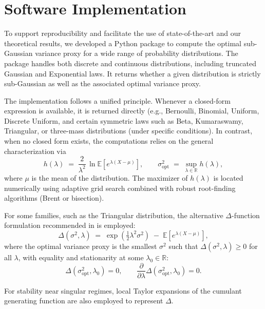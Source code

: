 \documentclass[a4paper, 10pt]{article}
\theoremstyle{definition}
\begin{document}
\section{Software Implementation}
To support reproducibility and facilitate the use of state-of-the-art and our theoretical results, 
we developed a Python package to compute the optimal sub-Gaussian variance proxy for a wide range of probability distributions. 
The package handles both discrete and continuous distributions, including truncated Gaussian and Exponential laws. 
It returns whether a given distribution is strictly sub-Gaussian as well as the associated optimal variance proxy. 

The implementation follows a unified principle. 
Whenever a closed-form expression is available, it is returned directly (e.g., Bernoulli, Binomial, Uniform, Discrete Uniform, and certain symmetric laws such as Beta, Kumaraswamy, Triangular, or  three-mass distributions (under specific conditions). 
In contrast, when no closed form exists, the computations relies on the general characterization via
\[
h(\lambda) \;=\; \frac{2}{\lambda^{2}} \, \ln \mathbb{E}\!\left[e^{\lambda(X-\mu)}\right],
\qquad 
\sigma^2_{\text{opt}} \;=\; \sup_{\lambda \in \mathbb{R}} h(\lambda),
\]
where $\mu$ is the mean of the distribution. 
The maximizer of $h(\lambda)$ is located numerically using adaptive grid search combined with robust root-finding algorithms (Brent or bisection). 

For some families, such as the Triangular distribution, the alternative $\Delta$-function formulation recommended in \cite{arbel2020strict} is employed: 
\[
\Delta(\sigma^{2}, \lambda) \;=\; \exp\!\left(\tfrac{1}{2}\lambda^{2}\sigma^{2}\right) \;-\; \mathbb{E}\!\left[e^{\lambda(X-\mu)}\right],
\]
where the optimal variance proxy is the smallest $\sigma^{2}$ such that $\Delta(\sigma^{2}, \lambda) \geq 0$ for all $\lambda$, with equality and stationarity at some $\lambda_0 \in \mathbb{R}$:
\[
\Delta(\sigma_{\mathrm{opt}}^{2}, \lambda_0) = 0, 
\qquad 
\frac{\partial}{\partial \lambda}\Delta(\sigma_{\mathrm{opt}}^{2}, \lambda_0) = 0.
\]

For stability near singular regimes, local Taylor expansions of the cumulant generating function are also employed to represent $\Delta$.\\
\end{document}
